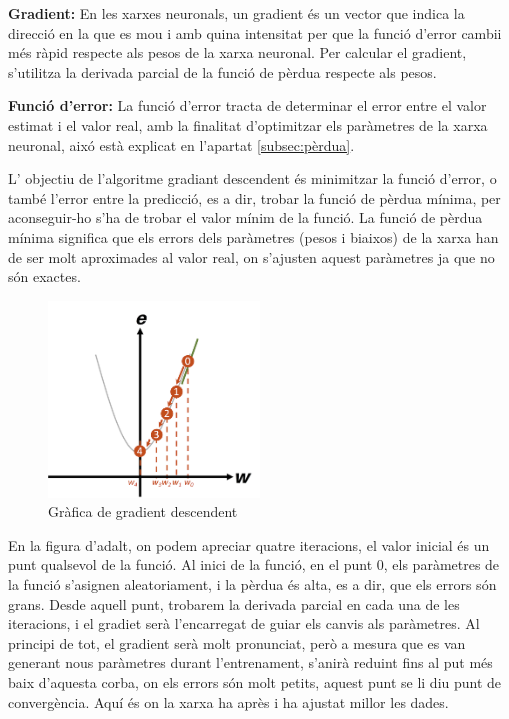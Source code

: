 \begin{enumerate}
\begin{itemize}
         \textbf{Gradient: } En les xarxes neuronals, un gradient és un vector que indica la direcció en la que es mou i amb quina intensitat per que la funció d'error cambii més ràpid respecte als pesos de la xarxa neuronal. Per calcular el gradient, s'utilitza la derivada parcial de la funció de pèrdua respecte als pesos.

        \textbf{Funció d'error: } La funció d'error tracta de determinar el error entre el valor estimat i el valor real, amb la finalitat d'optimitzar els paràmetres de la xarxa neuronal, aixó està explicat en l'apartat \ref{subsec:pèrdua}.

         L' objectiu de l'algoritme gradiant descendent és minimitzar la funció d'error, o també l'error entre la predicció, es a dir, trobar la funció de pèrdua mínima, per aconseguir-ho s'ha de trobar el valor mínim de la funció. La funció de pèrdua mínima significa que els errors dels paràmetres (pesos i biaixos) de la xarxa han de ser molt aproximades al valor real, on s'ajusten aquest paràmetres ja que no són exactes.

        \begin{figure}[H]
         \centering
         \includegraphics[width=0.5\textwidth]{./figures/gradient_descendent.png}
        \caption{Gràfica de gradient descendent}
         \end{figure}

          En la figura d'adalt, on podem apreciar quatre iteracions, el valor inicial és un punt qualsevol de la funció. Al inici de la funció, en el punt 0, els paràmetres de la funció s'asignen aleatoriament, i la pèrdua és alta, es a dir, que els errors són grans. Desde aquell punt, trobarem la derivada parcial en cada una de les iteracions, i el gradiet serà l'encarregat de guiar els canvis als paràmetres.
          Al principi de tot, el gradient serà molt pronunciat, però a mesura que es van generant nous paràmetres durant l'entrenament, s'anirà reduint fins al put més baix d'aquesta corba, on els errors són molt petits, aquest punt se li diu punt de convergència. Aquí és on la xarxa ha après i ha ajustat millor les dades.


\end{itemize}
\end{enumerate}
